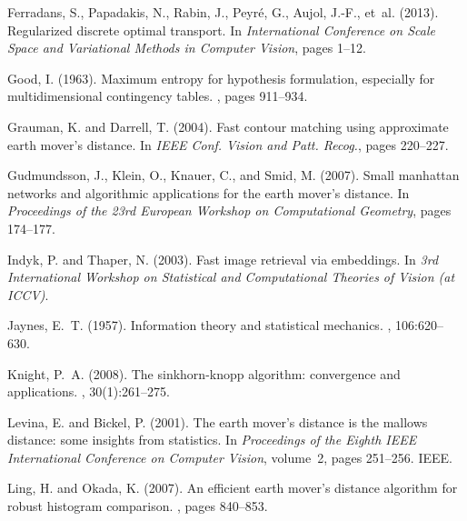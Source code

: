 \documentclass{amsart} %
\begin{document}
{{\begin{thebibliography}{}
Ferradans, S., Papadakis, N., Rabin, J., Peyr{\'e}, G., Aujol, J.-F., et~al.
  (2013).
\newblock Regularized discrete optimal transport.
\newblock In {\em International Conference on Scale Space and Variational
  Methods in Computer Vision}, pages 1--12.

Good, I. (1963).
\newblock Maximum entropy for hypothesis formulation, especially for
  multidimensional contingency tables.
, pages 911--934.

Grauman, K. and Darrell, T. (2004).
\newblock Fast contour matching using approximate earth mover's distance.
\newblock In {\em IEEE Conf. Vision and Patt. Recog.}, pages 220--227.

Gudmundsson, J., Klein, O., Knauer, C., and Smid, M. (2007).
\newblock Small manhattan networks and algorithmic applications for the earth
  mover’s distance.
\newblock In {\em Proceedings of the 23rd European Workshop on Computational
  Geometry}, pages 174--177.

Indyk, P. and Thaper, N. (2003).
\newblock Fast image retrieval via embeddings.
\newblock In {\em 3rd International Workshop on Statistical and Computational
  Theories of Vision (at ICCV)}.

Jaynes, E.~T. (1957).
\newblock Information theory and statistical mechanics.
, 106:620--630.

Knight, P.~A. (2008).
\newblock The sinkhorn-knopp algorithm: convergence and applications.
,
  30(1):261--275.

Levina, E. and Bickel, P. (2001).
\newblock The earth mover's distance is the mallows distance: some insights
  from statistics.
\newblock In {\em Proceedings of the Eighth IEEE International Conference on
  Computer Vision}, volume~2, pages 251--256. IEEE.

Ling, H. and Okada, K. (2007).
\newblock An efficient earth mover's distance algorithm for robust histogram
  comparison.
, pages
  840--853.


\end{thebibliography}}}
\end{document}
